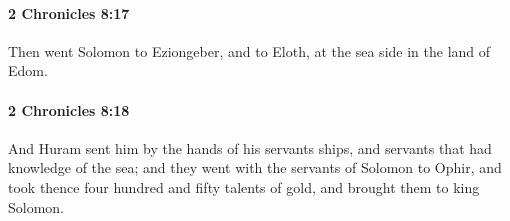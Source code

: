 		\paragraph{2 Chronicles 8:17} %
			\label{2CHRONICLES-8-17}

			Then went Solomon to Eziongeber, and to Eloth, at the sea side in the land of Edom.


		\paragraph{2 Chronicles 8:18} %
			\label{2CHRONICLES-8-18}

			And Huram sent him by the hands of his servants ships, and servants that had knowledge of the sea; and they went with the servants of Solomon to Ophir, and took thence four hundred and fifty talents of gold, and brought them to king Solomon.

